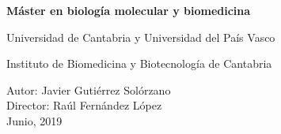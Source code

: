 \begin{titlepage}
\begin{center}
    \vspace*{0.3in}
    
    \begin{Large}
    \textbf{Máster en biología molecular y biomedicina}\\
    \end{Large}
    
    \vspace*{0.3in}
    
    Universidad de Cantabria y Universidad del País Vasco
    
    \vspace*{0.1in}
    
    \begin{large}
    Instituto de Biomedicina y Biotecnología de Cantabria \\
    \end{large}
    
    \vspace*{1.5in}
    
    
    \end{center}

    \begin{flushright}
        \begin{large}
         Autor: Javier Gutiérrez Solórzano \\
         \vspace*{0.08in}
         Director: Raúl Fernández López \\
         \vspace*{0.25in}
         Junio, 2019
        \end{large}
    \end{flushright}

\end{titlepage}